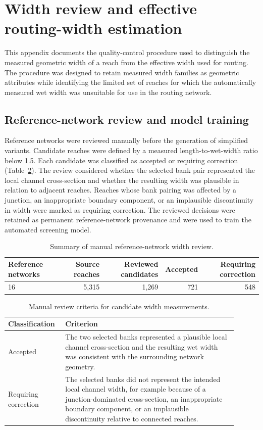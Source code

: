 \section{Width review and effective routing-width estimation}
\label{app:width_review}

This appendix documents the quality-control procedure used to distinguish the measured geometric width of a reach from the effective width used for routing. The procedure was designed to retain measured width families as geometric attributes while identifying the limited set of reaches for which the automatically measured wet width was unsuitable for use in the routing network.

\subsection{Reference-network review and model training}

Reference networks were reviewed manually before the generation of simplified variants. Candidate reaches were defined by a measured length-to-wet-width ratio below 1.5. Each candidate was classified as accepted or requiring correction (Table~\ref{tab:width_review_criteria}). The review considered whether the selected bank pair represented the local channel cross-section and whether the resulting width was plausible in relation to adjacent reaches. Reaches whose bank pairing was affected by a junction, an inappropriate boundary component, or an implausible discontinuity in width were marked as requiring correction. The reviewed decisions were retained as permanent reference-network provenance and were used to train the automated screening model.

\begin{table}[ht]
\centering
\caption{Summary of manual reference-network width review.}
\label{tab:width_review_summary}
\begin{tabular}{lrrrr}
\hline
Reference networks & Source reaches & Reviewed candidates & Accepted & Requiring correction \\
\hline
16 & 5,315 & 1,269 & 721 & 548 \\
\hline
\end{tabular}
\end{table}

\begin{table}[ht]
\centering
\caption{Manual review criteria for candidate width measurements.}
\label{tab:width_review_criteria}
\begin{tabular}{p{0.20\linewidth}p{0.70\linewidth}}
\hline
Classification & Criterion \\
\hline
Accepted & The two selected banks represented a plausible local channel cross-section and the resulting wet width was consistent with the surrounding network geometry. \\
Requiring correction & The selected banks did not represent the intended local channel width, for example because of a junction-dominated cross-section, an inappropriate boundary component, or an implausible discontinuity relative to connected reaches. \\
\hline
\end{tabular}
\end{table}

